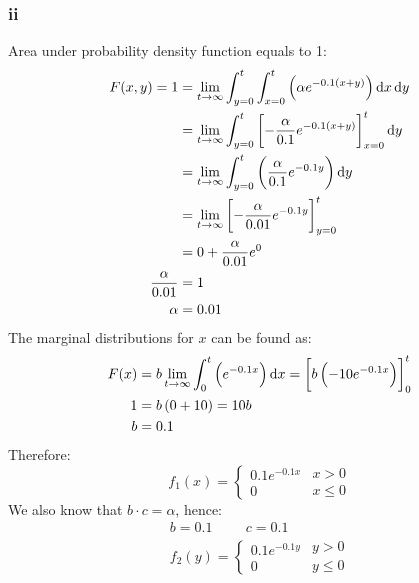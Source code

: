 \documentclass[11pt]{article}
\numberwithin{equation}{section}
\begin{document}
\subsubsection{ii}
Area under probability density function equals to 1:
\begin{align}
    F(x,y) = 1 &= \lim_{t\rightarrow \infty} \int_{y=0}^{t} \int_{x=0}^{t} \left(\alpha e^{-0.1\left(x+y\right)}\right) \dif x \dif y\\
    &= \lim_{t\rightarrow \infty} \int_{y=0}^{t} \left[ -\frac{\alpha}{0.1} e^{-0.1\left(x+y\right)} \right]_{x=0}^t \dif y\\
    &= \lim_{t\rightarrow \infty} \int_{y=0}^{t} \left(\frac{\alpha}{0.1} e^{-0.1y} \right) \dif y\\
    &= \lim_{t\rightarrow \infty} \left[ -\frac{\alpha}{0.01} e^{-0.1y} \right]_{y=0}^t\\
    &= 0 + \frac{\alpha}{0.01}e^{0}\\
    \frac{\alpha}{0.01} &= 1\\
    \alpha &= 0.01
\end{align}
The marginal distributions for $x$ can be found as:
\begin{align}
    F(x) &= b \lim_{t\rightarrow \infty} \int_0^t\left(e^{-0.1x}\right)\dif x = \left[b\left(-10 e^{-0.1x}\right)\right]_0^t\\
    1 &= b\left(0 + 10\right) = 10b \\
    b &= 0.1
\end{align}
Therefore:
\begin{equation}
    f_1(x) = \begin{cases}
        0.1e^{-0.1x}\\
        0
    \end{cases} \begin{array}{l}
        x > 0\\
        x \leq 0
    \end{array}
\end{equation}
We also know that $b\cdot c = \alpha$, hence:
\begin{gather}
    b = 0.1 \hspace{1cm} c = 0.1\\
    f_2(y) = \begin{cases}
        0.1e^{-0.1y}\\
        0
    \end{cases} \begin{array}{l}
        y > 0\\
        y \leq 0
    \end{array}
\end{gather}
\end{document}
